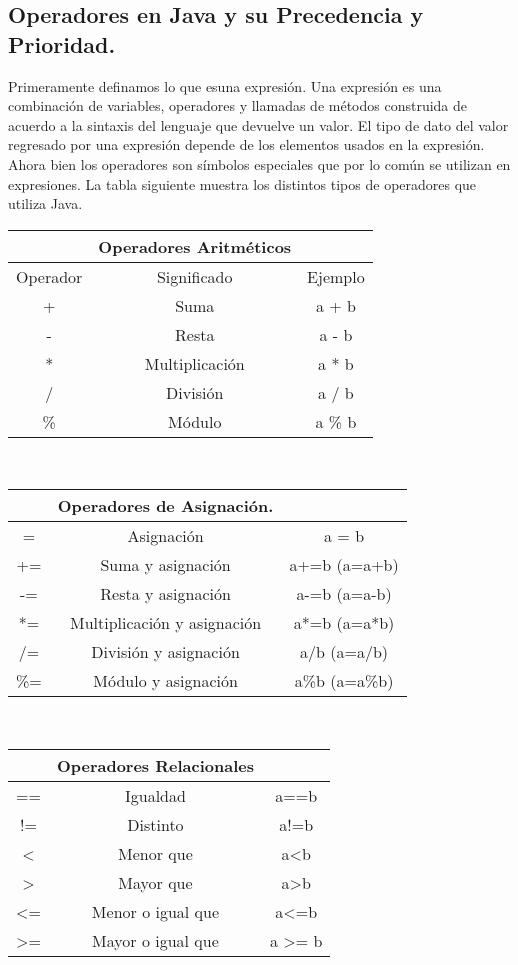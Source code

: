 \subsection{Operadores en Java y su Precedencia y Prioridad.} Primeramente definamos lo que esuna expresión. Una expresión es una combinación de variables, operadores y llamadas de métodos construida de acuerdo a la sintaxis del lenguaje que devuelve un valor. El tipo de dato del valor regresado por una expresión depende de los elementos usados en la expresión. Ahora bien los operadores son símbolos especiales que por lo común se utilizan en expresiones. La tabla siguiente muestra los distintos tipos de operadores que utiliza Java.
\begin{table}[H]
\centering 
	\begin{tabular}{ c | c | c }
		& \textbf{Operadores Aritméticos} & \\ \hline
		Operador & Significado & Ejemplo \\ \hline
		+ & Suma & a + b \\ \hline
		- & Resta & a - b \\ \hine
		* & Multiplicación & a * b \\ \hline 
		/ & División & a / b \\ \hline
		\% & Módulo & a \% b \\ \hline
\end{tabular} 
\end{table}
\\
\begin{table}[H]
	\centering
	\begin{tabular}{ c | c | c }
		& \textbf{Operadores de Asignación.} & \\ \hline 
		= & Asignación & a = b \\ \hline 
		+= & Suma y asignación & a+=b (a=a+b) \\ \hline
		-= & Resta y asignación & a-=b (a=a-b) \\ \hline 
		*= & Multiplicación y asignación & a*=b (a=a*b) \\ \hline 
		/= & División y asignación & a/b (a=a/b) \\ \hline 
		\%= & Módulo y asignación & a\%b (a=a\%b) \\ \hline 
\end{tabular}
\end{table}
\\
\begin{table}[H]
	\centering
	\begin{tabular}{ c | c | c }
		& \textbf{Operadores Relacionales} & \\ \hline
		== & Igualdad & a==b \\ \hline 	
		!= & Distinto & a!=b \\ \hline 
		< & Menor que & a<b \\ \hline
		> & Mayor que & a>b \\ \hline
		<= & Menor o igual que & a<=b \\ \hline
		>= & Mayor o igual que & a >= b \\ \hline 
\end{tabular}
\end{table}
